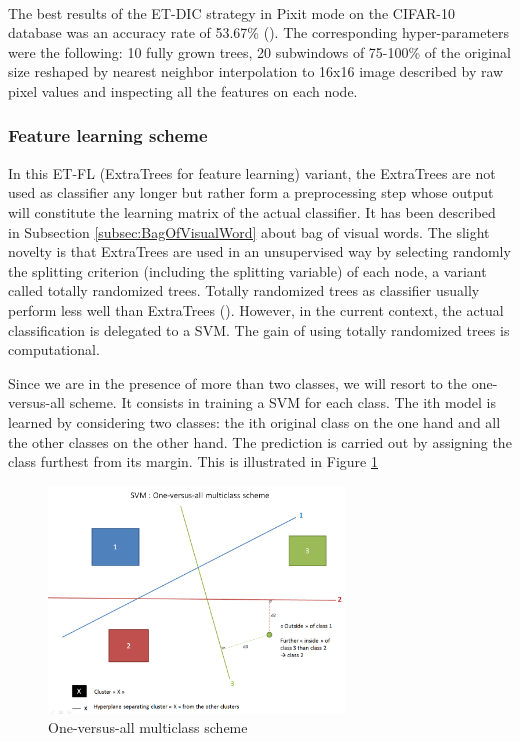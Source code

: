 \documentclass[a4paper]{report}
\begin{document}
			\paragraph{}
			The best results of the ET-DIC strategy in Pixit mode on the CIFAR-10 database was an accuracy rate of 53.67\% (\cite{base}). The corresponding hyper-parameters were the following: 10 fully grown trees, 20 subwindows of 75-100\% of the original size reshaped by nearest neighbor interpolation to 16x16 image described by raw pixel values and inspecting all the features on each node.
			
			
			\subsubsection{Feature learning scheme}
			In this ET-FL (ExtraTrees for feature learning) variant, the ExtraTrees are not used as classifier any longer but rather form a preprocessing step whose output will constitute the learning matrix of the actual classifier. It has been described in Subsection \ref{subsec:BagOfVisualWord} about bag of visual words. The slight novelty is that ExtraTrees are used in an unsupervised way by selecting randomly the splitting criterion (including the splitting variable) of each node, a variant called totally randomized trees. Totally randomized trees as classifier usually perform less well than ExtraTrees (\cite{extratrees}). However, in the current context, the actual classification is delegated to a SVM. The gain of using totally randomized trees is computational.
		\par
		Since we are in the presence of more than two classes, we will resort to the one-versus-all scheme. It consists in training a SVM for each class. The ith model is learned by considering two classes: the ith original class on the one hand and all the other classes on the other hand. The prediction is carried out by assigning the class furthest from its margin. This is illustrated in Figure \ref{fig:SVMOneVersusAll}
		\begin{figure}
			\centering
				\includegraphics[width=0.7\textwidth]{images/SVMOneVersusAll.png}
			\caption{\label{fig:SVMOneVersusAll}One-versus-all multiclass scheme}
		\end{figure}
		
\end{document}
